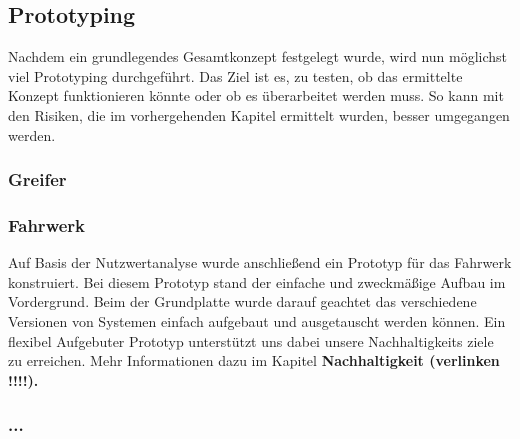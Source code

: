 \subsection{Prototyping}

Nachdem ein grundlegendes Gesamtkonzept festgelegt wurde, wird nun möglichst viel Prototyping durchgeführt. Das Ziel ist es, zu testen, ob das ermittelte Konzept funktionieren könnte oder ob es überarbeitet werden muss. So kann mit den Risiken, die im vorhergehenden Kapitel ermittelt wurden, besser umgegangen werden.

\subsubsection{Greifer}


\subsubsection{Fahrwerk}

Auf Basis der Nutzwertanalyse wurde anschließend ein Prototyp für das Fahrwerk konstruiert. Bei diesem Prototyp stand der einfache und zweckmäßige Aufbau im Vordergrund. Beim der Grundplatte wurde darauf geachtet das verschiedene  Versionen von Systemen einfach aufgebaut und ausgetauscht werden können. Ein flexibel Aufgebuter Prototyp unterstützt uns dabei unsere Nachhaltigkeits ziele zu erreichen. Mehr Informationen dazu im Kapitel \textbf{Nachhaltigkeit (verlinken !!!!).} 

\subsubsection{...}

